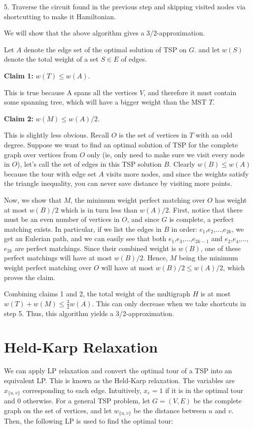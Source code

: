 \documentclass[12pt]{article}
\begin{document}
5. Traverse the circuit found in the previous step and skipping visited nodes via shortcutting to make it Hamiltonian.

We will show that the above algorithm gives a 3/2-approximation.

Let $A$ denote the edge set of the optimal solution of TSP on $G$. and let $w(S)$ denote the total weight of a set $S \in E$ of edges.

{\bf Claim 1:} $w(T)\leq w(A)$.

This is true because A spans all the vertices $V$, and therefore it must contain some spanning tree, which will have a bigger weight than the MST $T$.

{\bf Claim 2:} $w(M) \leq w(A)/2$.

This is slightly less obvious. Recall $O$ is the set of vertices in $T$ with an odd degree. Suppose we want to find an optimal solution of TSP for the complete graph over vertices from $O$ only (ie, only need to make sure we visit every node in $O$), let's call the set of edges in this TSP solution $B$. Clearly $w(B)\leq w(A)$ because the tour with edge set $A$ visits more nodes, and since the weights satisfy the triangle inequality, you can never save distance by visiting more points.

Now, we show that $M$, the minimum weight perfect matching over $O$ has weight at most $w(B)/2$ which is in turn less than $w(A)/2$. First, notice that there must be an even number of vertices in $O$, and since $G$ is complete, a perfect matching exists. In particular, if we list the edges in $B$ in order: $e_1$,$e_2$,$\ldots$,$e_{2k}$, we get an Eulerian path, and we can easily see that both $e_1$,$e_3$,$\ldots$,$e_{2k-1}$ and $e_2$,$e_4$,$\ldots$,$e_{2k}$ are perfect matchings. Since their combined weight is $w(B)$, one of these perfect matchings will have at most $w(B)/2$. Hence, $M$ being the minimum weight perfect matching over $O$ will have at most $w(B)/2 \leq w(A)/2$, which proves the claim.

Combining claims 1 and 2, the total weight of the multigraph $H$ is at most $w(T)+w(M) \leq \frac{3}{2}w(A)$. This can only decrease when we take shortcuts in step 5. Thus, this algorithm yields a 3/2-approximation.



\section{Held-Karp Relaxation}
We can apply LP relaxation and convert the optimal tour of a TSP into an equivalent LP. This is known as the Held-Karp relaxation. The variables are $x_{\{u,v\}}$ corresponding to each edge. Intuitively, $x_e=1$ if it is in the optimal tour and $0$ otherwise. For a general TSP problem, let $G=(V,E)$ be the complete graph on the set of vertices, and let $w_{\{u,v\}}$ be the distance between $u$ and $v$. Then, the following LP is used to find the optimal tour:
\end{document}
